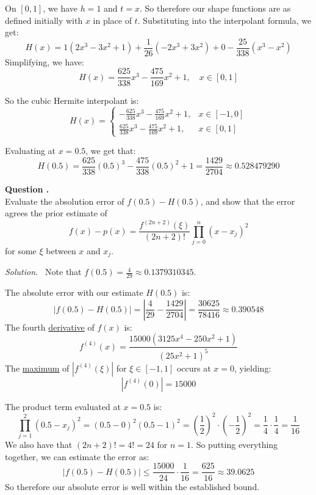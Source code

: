 \documentclass[12pt]{article}
\newcounter{question}
\newcounter{subquest}
\newcommand{\subquestion}{
    \stepcounter{subquest} 
    \vspace{.5em}
    \textbf{\large Question \thequestion.\thesubquest}
    \vspace{.25em}\ \\}
\newcommand{\solution}
    {\par\vspace{0.5em}\noindent\emph{Solution.}\ }
    {\par\vspace{1em}}
\begin{document}
On $[0,1]$, we have $h=1$ and $t=x$. So therefore our shape functions are as defined initially with $x$ in place of $t$.
Substituting into the interpolant formula, we get:
\[H(x) = 1(2x^3 - 3x^2 + 1) + \frac{1}{26}(-2x^3 + 3x^2) + 0 -\frac{25}{338}(x^3 - x^2)\]
Simplifying, we have:
\[H(x) = \frac{625}{338}x^3 - \frac{475}{169}x^2 + 1, \quad x\in[0,1]\]

So the cubic Hermite interpolant is:
\[H(x) = \begin{cases} -\frac{625}{338}x^3 - \frac{475}{169}x^2 + 1, & x\in[-1,0] \\[6pt] \frac{625}{338}x^3 - \frac{475}{169}x^2 + 1, & x\in[0,1] \end{cases}\]

Evaluating at $x=0.5$, we get that:
\[H(0.5) = \frac{625}{338}(0.5)^3 - \frac{475}{338}(0.5)^2 + 1 = \frac{1429}{2704} \approx 0.528479290\]

\subquestion
Evaluate the absolution error of $f(0.5)-H(0.5)$, and show that the error agrees the prior estimate of 
\[f(x)-p(x)=\frac{f^{(2n+2)}(\xi)}{(2n+2)!}\prod_{j=0}^{n}(x-x_j)^2\]
for some $\xi$ between $x$ and $x_j$.

\solution
Note that $f(0.5) = \frac{4}{29} \approx 0.1379310345$. 

The absolute error with our estimate $H(0.5)$ is:
\[|f(0.5)-H(0.5)| = \left|\frac{4}{29} - \frac{1429}{2704}\right| = \frac{30625}{78416} \approx 0.390548\]
The fourth \href{https://www.derivative-calculator.net/}{derivative} of $f(x)$ is:
\[f^{(4)}(x) = \frac{15000 \left(3125x^{4} - 250x^{2} + 1\right)}{\left(25x^{2} + 1\right)^{5}}\]
The \href{https://www.wolframalpha.com/input?i=maximum+calculator&assumption=%7B%22F%22%2C+%22GlobalMaximizeCalculator%22%2C+%22curvefunction%22%7D+-%3E%22abs%2815000%283125x%5E4-250x%5E2%2B1%29%2F%28%2825x%5E2%2B1%29%5E5%29%29%22&assumption=%7B%22F%22%2C+%22GlobalMaximizeCalculator%22%2C+%22domain%22%7D+-%3E%22-1+%3C%3D+x+%3C%3D+1%22}{maximum} of $|f^{(4)}(\xi)|$ for $\xi \in [-1,1]$ occurs at $x=0$, yielding:
\[|f^{(4)}(0)| = 15000\]

The product term evaluated at $x=0.5$ is:
\[\prod_{j=1}^{2}(0.5 - x_j)^2 = (0.5 - 0)^2 (0.5 - 1)^2 = \left(\frac{1}{2}\right)^2 \cdot \left(-\frac{1}{2}\right)^2 = \frac{1}{4} \cdot \frac{1}{4} = \frac{1}{16}\]
We also have that $(2n+2)! = 4! = 24$ for $n=1$.
So putting everything together, we can estimate the error as:
\[\left|f(0.5)-H(0.5)\right| \leq \frac{15000}{24} \cdot \frac{1}{16} = \frac{625}{16} \approx 39.0625\]
So therefore our absolute error is well within the established bound.
\end{document}
